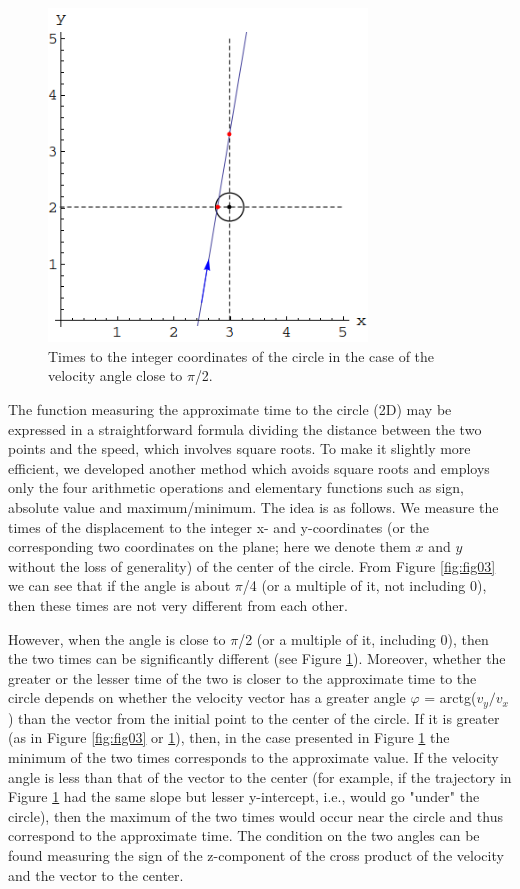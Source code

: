 \documentclass[prl,amsmath,amssymb, twocolumn, showpacs]{revtex4-1}
\begin{document}
\begin{figure}
\centering
\includegraphics [width=240pt]{fig04.png}
\caption{Times to the integer coordinates of the circle in the case of the velocity angle close to $\pi$/2.}
\label{fig:fig04}
\end{figure}

The function measuring the approximate time to the circle (2D) may be expressed in a straightforward formula dividing the distance between the two points and the speed, which involves square roots. To make it slightly more efficient, we developed another method which avoids square roots and employs only the four arithmetic operations and elementary functions such as sign, absolute value and maximum/minimum. The idea is as follows. We measure the times of the displacement to the integer x- and y-coordinates (or the corresponding two coordinates on the plane; here we denote them $x$ and $y$ without the loss of generality) of the center of the circle. From Figure \ref{fig:fig03} we can see that if the angle is about $\pi$/4 (or a multiple of it, not including 0), then these times are not very different from each other.

However, when the angle is close to $\pi$/2 (or a multiple of it, including 0), then the two times can be significantly different (see Figure \ref{fig:fig04}). Moreover, whether the greater or the lesser time of the two is closer to the approximate time to the circle depends on whether the velocity vector has a greater angle $\varphi$ = arctg($v_y/v_x$) than the vector from the initial point to the center of the circle. If it is greater (as in Figure \ref{fig:fig03} or \ref{fig:fig04}), then, in the case presented in Figure \ref{fig:fig04} the minimum of the two times corresponds to the approximate value. If the velocity angle is less than that of the vector to the center (for example, if the trajectory in Figure \ref{fig:fig04} had the same slope but lesser y-intercept, i.e., would go "under" the circle), then the maximum of the two times would occur near the circle and thus correspond to the approximate time. The condition on the two angles can be found measuring the sign of the z-component of the cross product of the velocity and the vector to the center. 
\end{document}
